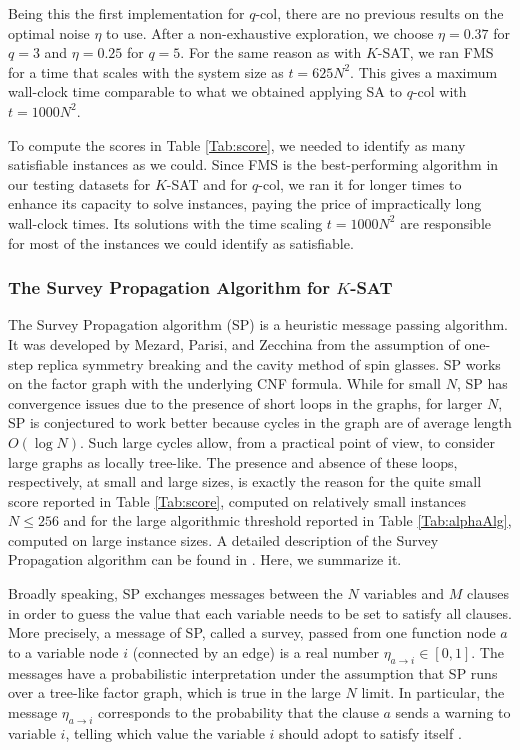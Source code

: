 \documentclass{article}
\begin{document}
Being this the first implementation for $q$-col, there are no previous results on the optimal noise $\eta$ to use. After a non-exhaustive exploration, we choose $\eta=0.37$ for $q=3$ and $\eta=0.25$ for $q=5$. For the same reason as with $K$-SAT, we ran FMS for a time that scales with the system size as $t=625N^{2}$. This gives a maximum wall-clock time comparable to what we obtained applying SA to $q$-col with $t=1000N^{2}$.

To compute the scores in Table \ref{Tab:score}, we needed to identify as many satisfiable instances as we could. Since FMS is the best-performing algorithm in our testing datasets for $K$-SAT and for $q$-col, we ran it for longer times to enhance its capacity to solve instances, paying the price of impractically long wall-clock times. Its solutions with the time scaling $t=1000N^{2}$ are responsible for most of the instances we could identify as satisfiable.

\subsubsection{The Survey Propagation Algorithm for $K$-SAT} \label{subsubsec:SP}

The Survey Propagation algorithm (SP) is a heuristic message passing algorithm. It was developed by Mezard, Parisi, and Zecchina \cite{MezardSP} from the assumption of one-step replica symmetry breaking and the cavity method of spin glasses. SP works on the factor graph with the underlying CNF formula. While for small $N$, SP has convergence issues due to the presence of short loops in the graphs, for larger $N$, SP is conjectured to work better because cycles in the graph are of average length $O(\log N)$. Such large cycles allow, from a practical point of view, to consider large graphs as locally tree-like. The presence and absence of these loops, respectively, at small and large sizes, is exactly the reason for the quite small score reported in Table \ref{Tab:score}, computed on relatively small instances $N\leq 256$ and for the large algorithmic threshold reported in Table \ref{Tab:alphaAlg}, computed on large instance sizes. A detailed description of the Survey Propagation algorithm can be found in \cite{MezardSP, braunstein2005survey}. Here, we summarize it. 

Broadly speaking, SP exchanges messages between the $N$ variables and $M$ clauses in order to guess the value that each variable needs to be set to satisfy all clauses. More precisely, a message of SP, called a survey, passed from one function node $a$ to a variable node $i$ (connected by an edge) is a real number $\eta_{a\to i} \in [0, 1]$. The messages have a probabilistic interpretation under the assumption that SP runs over a tree-like factor graph, which is true in the large $N$ limit. In particular, the message $\eta_{a\to i}$ corresponds to the probability that the clause $a$ sends a warning to variable $i$, telling which value the variable $i$ should adopt to satisfy itself \cite{parisi2003probabilistic, ManevaSP}.
\end{document}
